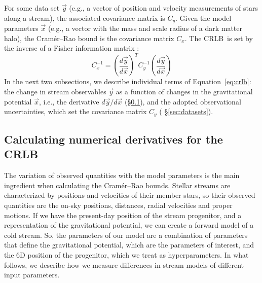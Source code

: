 \documentclass[modern]{aastex61}
\newcommand{\acronym}[1]{{\small{#1}}}
\newcommand{\CRLB}{\acronym{CRLB}}
\begin{document}
For some data set $\vec{y}$ (e.g., a vector of position and velocity measurements of stars along a stream), the associated covariance matrix is $C_y$.
Given the model parameters $\vec{x}$ (e.g., a vector with the mass and scale radius of a dark matter halo), the Cram\' er--Rao bound is the covariance matrix $C_x$.
The \CRLB\ is set by the inverse of a Fisher information matrix \citep{}:
\begin{equation}
C_x^{-1} = \left(\frac{d\vec{y}}{d\vec{x}}\right)^{T} C_y^{-1} \left(\frac{d\vec{y}}{d\vec{x}}\right)
\label{eq:crlb}
\end{equation}
In the next two subsections, we describe individual terms of Equation~\ref{eq:crlb}: the change in stream observables $\vec{y}$ as a function of changes in the gravitational potential $\vec{x}$, i.e., the derivative $d\vec{y}/d\vec{x}$ (\S\ref{sec:derivatives}), and the adopted observational uncertainties, which set the covariance matrix $C_y$ ( \S\ref{sec:datasets}).

\subsection{Calculating numerical derivatives for the \CRLB}
\label{sec:derivatives}
The variation of observed quantities with the model parameters is the main ingredient when calculating the Cram\' er--Rao bounds.
Stellar streams are characterized by positions and velocities of their member stars, so their observed quantities are the on-sky positions, distances, radial velocities and proper motions.
If we have the present-day position of the stream progenitor, and a representation of the gravitational potential, we can create a forward model of a cold stream.
So, the parameters of our model are a combination of parameters that define the gravitational potential, which are the parameters of interest, and the 6D position of the progenitor, which we treat as hyperparameters.
In what follows, we describe how we measure differences in stream models of different input parameters.
\end{document}
